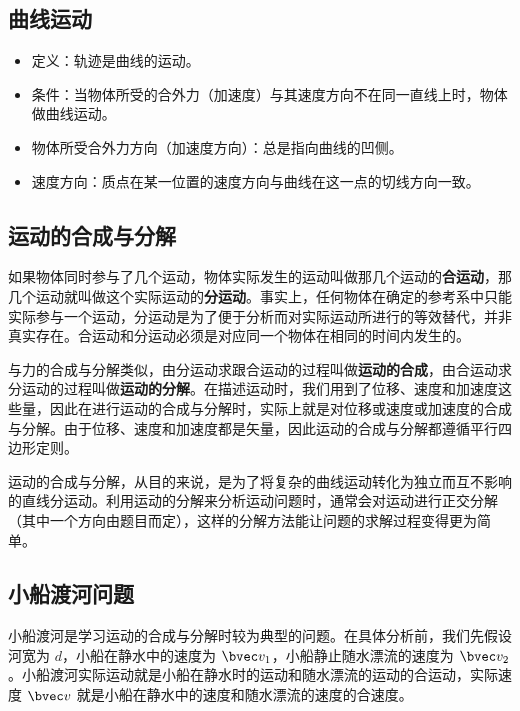 

\subsection{曲线运动}

\begin{itemize}
\item 定义：轨迹是曲线的运动。
\item 条件：当物体所受的合外力（加速度）与其速度方向不在同一直线上时，物体做曲线运动。
\item 物体所受合外力方向（加速度方向）：总是指向曲线的凹侧。
\item 速度方向：质点在某一位置的速度方向与曲线在这一点的切线方向一致。
\end{itemize}

\subsection{运动的合成与分解}

如果物体同时参与了几个运动，物体实际发生的运动叫做那几个运动的\textbf{合运动}，那几个运动就叫做这个实际运动的\textbf{分运动}。事实上，任何物体在确定的参考系中只能实际参与一个运动，分运动是为了便于分析而对实际运动所进行的等效替代，并非真实存在。合运动和分运动必须是对应同一个物体在相同的时间内发生的。

与力的合成与分解类似，由分运动求跟合运动的过程叫做\textbf{运动的合成}，由合运动求分运动的过程叫做\textbf{运动的分解}。在描述运动时，我们用到了位移、速度和加速度这些量，因此在进行运动的合成与分解时，实际上就是对位移或速度或加速度的合成与分解。由于位移、速度和加速度都是矢量，因此运动的合成与分解都遵循平行四边形定则。

运动的合成与分解，从目的来说，是为了将复杂的曲线运动转化为独立而互不影响的直线分运动。利用运动的分解来分析运动问题时，通常会对运动进行正交分解（其中一个方向由题目而定），这样的分解方法能让问题的求解过程变得更为简单。

\subsection{小船渡河问题}

小船渡河是学习运动的合成与分解时较为典型的问题。在具体分析前，我们先假设河宽为 $d$，小船在静水中的速度为 $\bvec v_1$，小船静止随水漂流的速度为 $\bvec v_2$。小船渡河实际运动就是小船在静水时的运动和随水漂流的运动的合运动，实际速度 $\bvec v$ 就是小船在静水中的速度和随水漂流的速度的合速度。

